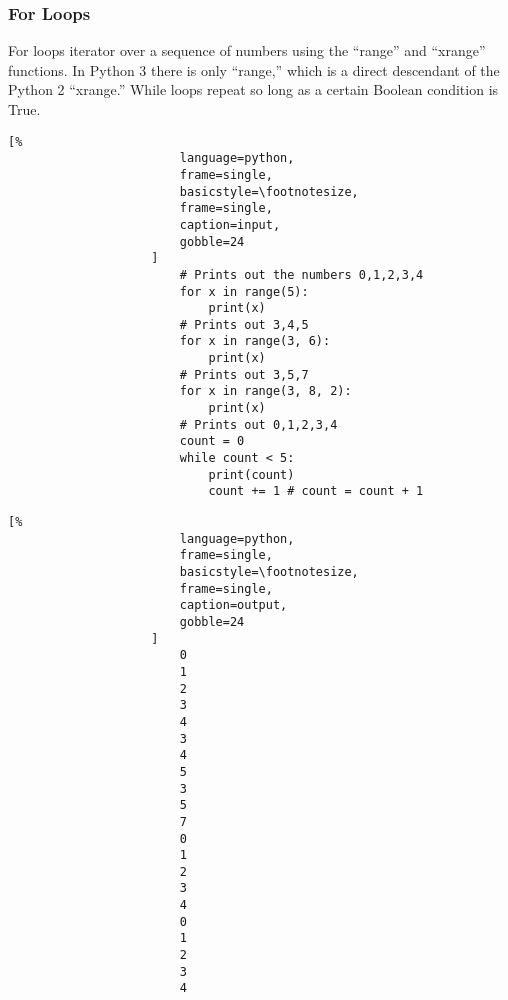 \documentclass[crop=false,class=book]{standalone}
\begin{document}
            \subsubsection{For Loops}
                For loops iterator over a sequence of numbers using
                the ``range'' and ``xrange'' functions. In Python 3
                there is only ``range,'' which is a direct descendant
                of the Python 2 ``xrange.'' While loops repeat so
                long as a certain Boolean condition is True. \newline
                \begin{minipage}[t]{.48\textwidth}
                    \centering
                    \begin{lstlisting}[%
                        language=python,
                        frame=single,
                        basicstyle=\footnotesize,
                        frame=single,
                        caption=input,
                        gobble=24
                    ]
                        # Prints out the numbers 0,1,2,3,4
                        for x in range(5):
                            print(x)
                        # Prints out 3,4,5
                        for x in range(3, 6):
                            print(x)
                        # Prints out 3,5,7
                        for x in range(3, 8, 2):
                            print(x)
                        # Prints out 0,1,2,3,4
                        count = 0
                        while count < 5:
                            print(count)
                            count += 1 # count = count + 1
                    \end{lstlisting}
                \end{minipage}\hfill
                \begin{minipage}[t]{.48\textwidth}
                    \centering
                    \begin{lstlisting}[%
                        language=python,
                        frame=single,
                        basicstyle=\footnotesize,
                        frame=single,
                        caption=output,
                        gobble=24
                    ]
                        0
                        1
                        2
                        3
                        4
                        3
                        4
                        5
                        3
                        5
                        7
                        0
                        1
                        2
                        3
                        4
                        0
                        1
                        2
                        3
                        4
                    \end{lstlisting}
                \end{minipage}
\end{document}
